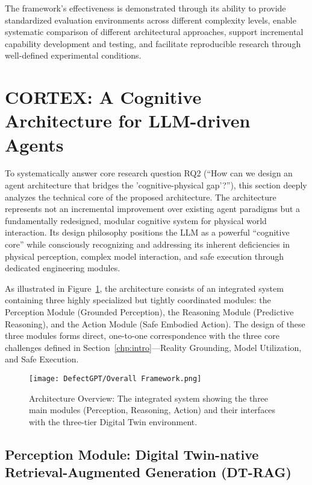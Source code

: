 The framework's effectiveness is demonstrated through its ability to provide standardized evaluation environments across different complexity levels, enable systematic comparison of different architectural approaches, support incremental capability development and testing, and facilitate reproducible research through well-defined experimental conditions.

\section{CORTEX: A Cognitive Architecture for LLM-driven Agents}

To systematically answer core research question RQ2 (``How can we design an agent architecture that bridges the 'cognitive-physical gap'?''), this section deeply analyzes the technical core of the proposed architecture. The architecture represents not an incremental improvement over existing agent paradigms but a fundamentally redesigned, modular cognitive system for physical world interaction. Its design philosophy positions the LLM as a powerful ``cognitive core'' while consciously recognizing and addressing its inherent deficiencies in physical perception, complex model interaction, and safe execution through dedicated engineering modules.

As illustrated in Figure~\ref{fig:architecture_overview}, the architecture consists of an integrated system containing three highly specialized but tightly coordinated modules: the Perception Module (Grounded Perception), the Reasoning Module (Predictive Reasoning), and the Action Module (Safe Embodied Action). The design of these three modules forms direct, one-to-one correspondence with the three core challenges defined in Section~\ref{chp:intro}—Reality Grounding, Model Utilization, and Safe Execution.

\begin{figure}[htbp]
\centering
\texttt{[image: DefectGPT/Overall Framework.png]}
\caption{Architecture Overview: The integrated system showing the three main modules (Perception, Reasoning, Action) and their interfaces with the three-tier Digital Twin environment.}
\label{fig:architecture_overview}
\end{figure}

\subsection{Perception Module: Digital Twin-native Retrieval-Augmented Generation (DT-RAG)}

